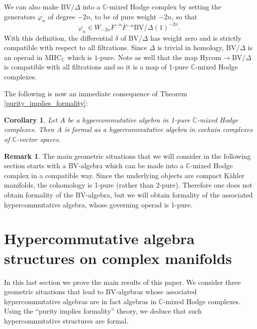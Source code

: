 \documentclass[a4paper]{amsart}
\newtheorem{coro}[theo]{Corollary}
\theoremstyle{definition}
\newtheorem{rema}[theo]{Remark}
\theoremstyle{theorem}
\newcommand{\CC}{\mathbb{C}}
\newcommand{\ov}{\overline}
\newcommand{\MHC}{{\mathrm{MHC}}}
\newcommand{\BV}{{\mathrm{BV}}}
\newcommand{\vp}{\varphi}
\begin{document}
We can also make $\BV/\Delta$ into a $\CC$-mixed Hodge complex by setting the generators $\vp_n$ of degree $-2n$, to be of pure weight $-2n$, so that 
\[\vp_n\in W_{-2n}F^{-n}{\ov{F}}{}^{-n}\BV/\Delta(1)^{-2n}.\]
With this definition, the differential $\delta$ of $\BV/\Delta$ has weight zero and is strictly compatible with respect to all filtrations.
Since $\Delta$ is trivial in homology, $\BV/\Delta$ is an operad in $\MHC_\CC$ which is $1$-pure.
Note as well that the map $\mathrm{Hycom}\to \BV/\Delta$ is compatible with all filtrations and so it is a map of 1-pure $\CC$-mixed Hodge complexes.

The following is now an immediate consequence of Theorem \ref{purity_implies_formality}:

\begin{coro}\label{hycomformal}
 Let $A$ be a hypercommutative algebra in 1-pure $\CC$-mixed Hodge complexes. Then $A$ is formal as a hypercommutative algebra in cochain complexes of $\CC$-vector spaces.
\end{coro}

\begin{rema}
The main geometric situations that we will consider in the following section starts with a $\BV$-algebra which
can be made into a $\CC$-mixed Hodge complex in a compatible way. Since the underlying objects are compact Kähler manifolds, the cohomology is 1-pure (rather than 2-pure). Therefore one does not obtain formality of the $\BV$-algebra, but we will obtain formality of
the associated hypercommutative algebra, whose governing operad is 1-pure.
\end{rema}






\section{Hypercommutative algebra structures on complex manifolds}\label{secGeom}

In this last section we prove the main results of this paper. We consider three geometric situations that lead to $\BV$-algebras whose associated hypercommutative algebras are in fact algebras in $\CC$-mixed Hodge complexes. Using the ``purity implies formality'' theory, we deduce that such hypercommutative structures are formal.
\end{document}
